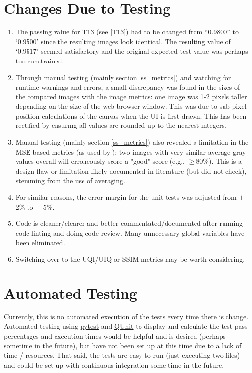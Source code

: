 \documentclass[12pt, titlepage]{article}
\begin{document}
\section{Changes Due to Testing}
\begin{enumerate}
  \item The passing value for T13 (see \ref{T13}) had to be changed from ``0.9800'' to `0.9500' since the
    resulting images look identical. The resulting value of `0.9617' seemed satisfactory and the original
    expected test value was perhaps too constrained.
  \item Through manual testing (mainly section \ref{ss_metrics})
    and watching for runtime warnings and errors,
    a small discrepancy was found in the sizes of the compared images with
    the image metrics: one image was 1-2 pixels taller depending on the size
    of the web browser window. This was due to sub-pixel position calculations
    of the canvas when the UI is first drawn. This has been rectified by
    ensuring all values are rounded up to the nearest integers.
  \item Manual testing (mainly section \ref{ss_metrics}) also
    revealed a limitation in the MSE-based metrics (as used by \progname{}):
    two images with very similar average gray values overall will
    erroneously score a "good" score (e.g., $\ge 80\%$). This is a design
    flaw or limitation likely documented in literature (but did not check),
    stemming from the use of averaging.
  \item For similar reasons, the error margin for the unit tests was adjusted from $\pm$ 2\% to $\pm$ 5\%.
  \item Code is cleaner/clearer and better commentated/documented after running code linting and
    doing code review. Many unnecessary global variables have been eliminated.
  \item Switching over to the UQI/UIQ or SSIM metrics may be worth considering.
\end{enumerate}


\section{Automated Testing}
Currently, this is no automated execution of the tests every time there is change.
Automated testing using \href{https://pytest.org}{pytest} and \href{https://qunitjs.com}{QUnit}
to display and calculate the test pass percentages and execution times would be helpful
and is desired (perhaps sometime in the future),
but have not been set up at this time due to a lack of time / resources.
That said, the tests are easy to run (just executing two files)
and could be set up with continuous integration some time in the future.
\end{document}
